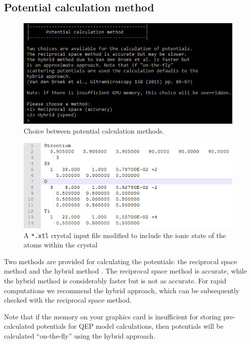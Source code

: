\documentclass[12pt,a4paper]{article}
\begin{document}
\subsection{Potential calculation method}
\label{sec:pot_calc}

\begin{figure}[!h]
\begin{center}
    \includegraphics[scale=0.75]{Figures/potential_method.png}
\caption{Choice between potential calculation methods.}
\label{fig:potential_method}
\end{center}
\end{figure}
\begin{figure}
	\centering
	\includegraphics{figures/SrTiO3_ionic.PNG}
	\caption{A \texttt{*.xtl} crystal input file modified to include the ionic state of the atoms within the crystal\label{fig:ionicxtl}}
\end{figure}
Two methods are provided for calculating the potentials: the reciprocal space method and the hybrid method \cite{VDB}.
The reciprocal space method is accurate, while the hybrid method is considerably faster but is not as accurate.
For rapid computations we recommend the hybrid approach, which can be subsequently checked with the reciprocal space method.

Note that if the memory on your graphics card is insufficient for storing pre-calculated potentials for QEP model calculations, then potentials will be calculated ``on-the-fly'' using the hybrid approach.
\end{document}
